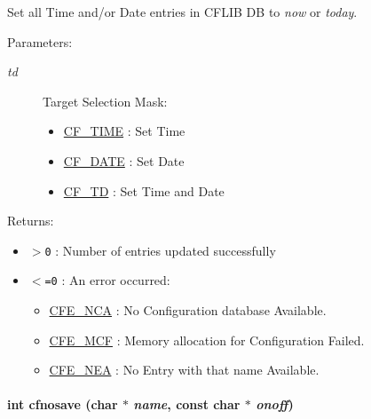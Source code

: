 Set all Time and/or Date entries in CFLIB DB to {\em now\/} or {\em today\/}. 

\begin{Desc}
\item[Parameters:]
\begin{description}
\item[{\em td}]Target Selection Mask: \begin{itemize}
\item \hyperlink{group__special__options__mask_g0fde537a92deb77f75b21c9e8d306509}{CF\_\-TIME} : Set Time \item \hyperlink{group__special__options__mask_g1c5b511a34d2c0db6631539ba81a4386}{CF\_\-DATE} : Set Date \item \hyperlink{group__special__options__mask_g8a50d7326b057d262f53ef84a166f9c5}{CF\_\-TD} : Set Time and Date\end{itemize}
\end{description}
\end{Desc}
\begin{Desc}
\item[Returns:]\begin{itemize}
\item {\tt $>$0} : Number of entries updated successfully \item {\tt $<$=0} : An error occurred:\begin{itemize}
\item \hyperlink{group__errors_gf8cd36471ddcc549668f49238855609d}{CFE\_\-NCA} : No Configuration database Available. \item \hyperlink{group__errors_g127dc37aea6ba5ef8d9dfe5cb9c629eb}{CFE\_\-MCF} : Memory allocation for Configuration Failed. \item \hyperlink{group__errors_g7f7e54a5ccefa34556fe6da3b35b4f27}{CFE\_\-NEA} : No Entry with that name Available.  \end{itemize}
\end{itemize}
\end{Desc}
\hypertarget{group__setting__saving_g0f6ed90e3ecfa0074af1635a0e4339ef}{
\paragraph[{cfnosave}]{\setlength{\rightskip}{0pt plus 5cm}int cfnosave (char $\ast$ {\em name}, \/  const char $\ast$ {\em onoff})}\hfill}
\label{group__setting__saving_g0f6ed90e3ecfa0074af1635a0e4339ef}


